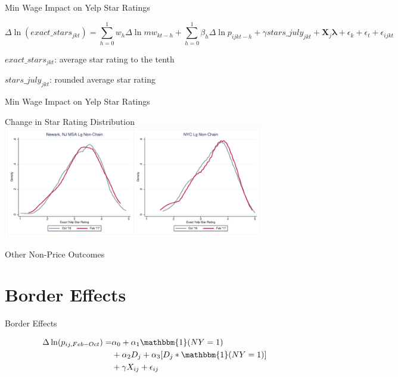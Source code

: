 \documentclass[xcolor=table]{beamer}
\begin{document}
\begin{spacing}{1.2}
\begin{frame}{Min Wage Impact on Yelp Star Ratings}

\begin{dmath}
\Delta \ln(exact\_stars_{jkt}) =\sum_{h=0}^{1}w_h \Delta \ln mw_{kt-h}  +   \sum_{h=0}^{1}\beta_h \Delta \ln p_{ijkt-h}  + \gamma stars\_july_{jkt} +\boldsymbol{X}_j  \boldsymbol{\lambda} + \epsilon_k + \epsilon_t + \epsilon_{ijkt}
\end{dmath}

$exact\_stars_{jkt}$: average star rating to the tenth

$stars\_july_{jkt}$: rounded average star rating


\end{frame}


\begin{frame}{Min Wage Impact on Yelp Star Ratings}
\centering
\scriptsize

\end{frame}


\begin{frame}{Change in Star Rating Distribution}
\centering
\includegraphics[width=4.5in]{star_densities.pdf}
\end{frame}

\begin{frame}{Other Non-Price Outcomes }
\small
\centering

\end{frame}


\section{Border Effects}


\begin{frame}{Border Effects}

$$
\begin{aligned}
\Delta \ln (p_{ij,Feb-Oct})  = & \alpha_0 + \alpha_1  \mathbbm{1}(NY=1)  \\
& + \alpha_2 D_{j} + \alpha_3[D_j * \mathbbm{1}(NY=1)]  \\
& +\gamma X_{ij}  + \epsilon_{ij} 
\end{aligned}
$$


\end{frame}
\end{spacing}
\end{document}
